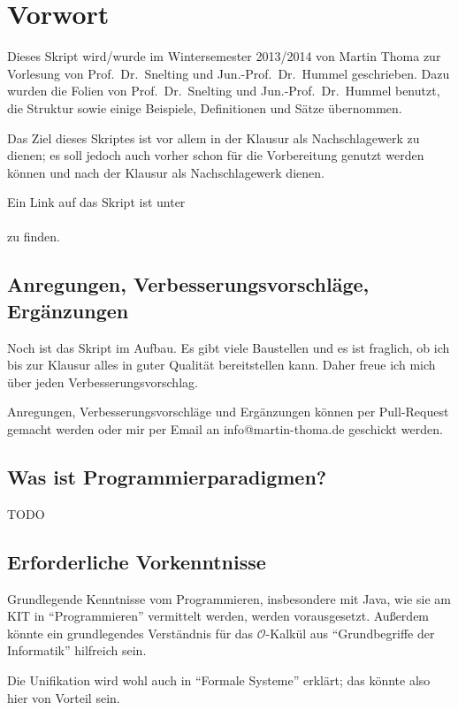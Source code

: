\chapter*{Vorwort}
Dieses Skript wird/wurde im Wintersemester 2013/2014
von Martin Thoma zur Vorlesung von Prof.~Dr.~Snelting und Jun.-Prof.~Dr.~Hummel 
geschrieben. Dazu wurden
die Folien von Prof.~Dr.~Snelting und Jun.-Prof.~Dr.~Hummel benutzt, die Struktur
sowie einige Beispiele, Definitionen und Sätze übernommen.

Das Ziel dieses Skriptes ist vor allem
in der Klausur als Nachschlagewerk zu dienen; es soll jedoch auch
vorher schon für die Vorbereitung genutzt werden können und nach
der Klausur als Nachschlagewerk dienen.

Ein Link auf das Skript ist unter \\
\href{http://martin-thoma.com/programmierparadigmen/}{}\\
zu finden.

\section*{Anregungen, Verbesserungsvorschläge, Ergänzungen}
Noch ist das Skript im Aufbau. Es gibt viele Baustellen und es ist
fraglich, ob ich bis zur Klausur alles in guter Qualität bereitstellen
kann. Daher freue ich mich über jeden Verbesserungsvorschlag.

Anregungen, Verbesserungsvorschläge und Ergänzungen können per
Pull-Request gemacht werden oder mir per Email an info@martin-thoma.de
geschickt werden.

\section*{Was ist Programmierparadigmen?}

TODO

\section*{Erforderliche Vorkenntnisse}
Grundlegende Kenntnisse vom Programmieren, insbesondere mit Java,
wie sie am KIT in \enquote{Programmieren} vermittelt werden, werden
vorausgesetzt. Außerdem könnte ein grundlegendes Verständnis für 
das $\mathcal{O}$-Kalkül aus \enquote{Grundbegriffe der Informatik} hilfreich sein.

Die Unifikation wird wohl auch in \enquote{Formale Systeme}
erklärt; das könnte also hier von Vorteil sein.
